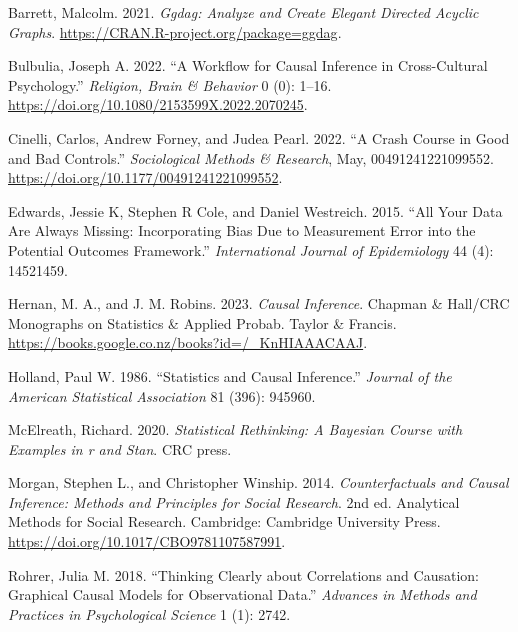 \documentclass[
  singlecolumn]{report}
\newlength{\cslhangindent}
\newlength{\cslentryspacingunit} %
\newenvironment{CSLReferences}[2] %
 {%
  \setlength{\parindent}{0pt}
  \ifodd #1
  \let\oldpar\par
  \def\par{\hangindent=\cslhangindent\oldpar}
  \fi
  \setlength{\parskip}{#2\cslentryspacingunit}
 }%
 {}
\begin{document}
\hypertarget{refs}{}
\begin{CSLReferences}{1}{0}
\leavevmode{}%
Barrett, Malcolm. 2021. \emph{Ggdag: Analyze and Create Elegant Directed
Acyclic Graphs}. \url{https://CRAN.R-project.org/package=ggdag}.

\leavevmode{}%
Bulbulia, Joseph A. 2022. {``A Workflow for Causal Inference in
Cross-Cultural Psychology.''} \emph{Religion, Brain \& Behavior} 0 (0):
1--16. \url{https://doi.org/10.1080/2153599X.2022.2070245}.

\leavevmode{}%
Cinelli, Carlos, Andrew Forney, and Judea Pearl. 2022. {``A Crash Course
in Good and Bad Controls.''} \emph{Sociological Methods \& Research},
May, 00491241221099552. \url{https://doi.org/10.1177/00491241221099552}.

\leavevmode{}%
Edwards, Jessie K, Stephen R Cole, and Daniel Westreich. 2015. {``All
Your Data Are Always Missing: Incorporating Bias Due to Measurement
Error into the Potential Outcomes Framework.''} \emph{International
Journal of Epidemiology} 44 (4): 14521459.

\leavevmode{}%
Hernan, M. A., and J. M. Robins. 2023. \emph{Causal Inference}. Chapman
\& Hall/CRC Monographs on Statistics \& Applied Probab. Taylor \&
Francis. \url{https://books.google.co.nz/books?id=/_KnHIAAACAAJ}.

\leavevmode{}%
Holland, Paul W. 1986. {``Statistics and Causal Inference.''}
\emph{Journal of the American Statistical Association} 81 (396): 945960.

\leavevmode{}%
McElreath, Richard. 2020. \emph{Statistical Rethinking: A Bayesian
Course with Examples in r and Stan}. CRC press.

\leavevmode{}%
Morgan, Stephen L., and Christopher Winship. 2014. \emph{Counterfactuals
and Causal Inference: Methods and Principles for Social Research}. 2nd
ed. Analytical Methods for Social Research. Cambridge: Cambridge
University Press. \url{https://doi.org/10.1017/CBO9781107587991}.

\leavevmode{}%
Rohrer, Julia M. 2018. {``Thinking Clearly about Correlations and
Causation: Graphical Causal Models for Observational Data.''}
\emph{Advances in Methods and Practices in Psychological Science} 1 (1):
2742.


\end{CSLReferences}
\end{document}
